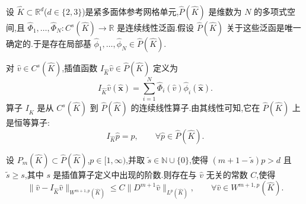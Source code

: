 \begin{note}[假设与插值算子的定义]\label{note:appendix-c-7}
设 $\widehat K\subset\mathbb R^d$($d\in\{2,3\}$)是紧多面体参考网格单元,$\widehat P(\widehat K)$ 是维数为 $N$ 的多项式空间,且
$\widehat\Phi_1,\ldots,\widehat\Phi_N:C^s(\widehat K)\to\mathbb R$ 是连续线性泛函.假设 $\widehat P(\widehat K)$ 关于这些泛函是唯一确定的.于是存在局部基
$\widehat\phi_1,\ldots,\widehat\phi_N\in\widehat P(\widehat K)$.

对 $\widehat v\in C^s(\widehat K)$,插值函数 $I_{\widehat K}\widehat v\in\widehat P(\widehat K)$ 定义为
\[
 I_{\widehat K}\widehat v(\widehat{\bm x})
 =\sum_{i=1}^N\widehat\Phi_i(\widehat v)\widehat\phi_i(\widehat{\bm x}).
\]
算子 $I_{\widehat K}$ 是从 $C^s(\widehat K)$ 到 $\widehat P(\widehat K)$ 的连续线性算子.由其线性可知,它在 $\widehat P(\widehat K)$ 上是恒等算子:
\[
 I_{\widehat K}\widehat p=\widehat p,
 \qquad \forall\widehat p\in\widehat P(\widehat K).
\]
\end{note}

\begin{theorem}[参考网格单元上的插值误差估计]\label{thm:appendix-c-8}
设 $P_m(\widehat K)\subset\widehat P(\widehat K)$,$p\in[1,\infty)$,并取
$\widetilde s\in\mathbb N\cup\{0\}$,使得
$(m+1-\widetilde s)p>d$ 且 $\widetilde s\ge s$,其中 $s$ 是插值算子定义中出现的阶数.则存在与 $\widehat v$ 无关的常数 $C$,使得
\begin{equation}\label{eq:appendix-c-4}
 \|\widehat v-I_{\widehat K}\widehat v\|_{W^{m+1,p}(\widehat K)}
 \le C\|D^{m+1}\widehat v\|_{L^p(\widehat K)},
 \qquad \forall\widehat v\in W^{m+1,p}(\widehat K).
\end{equation}
\end{theorem}

